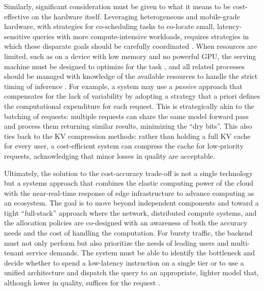 \documentclass[11pt]{article}
\begin{document}
Similarly, significant consideration must be given to what it means to be cost-effective on the hardware itself. Leveraging heterogeneous and mobile-grade hardware, with strategies for co-scheduling tasks to co-locate small, latency-sensitive queries with more compute-intensive workloads, requires strategies in which these disparate goals should be carefully coordinated \cite{ref350}. When resources are limited, such as on a device with low memory and no powerful GPU, the serving machine must be designed to optimize for the task \cite{ref351}, and all related processes should be managed with knowledge of the available resources to handle the strict timing of inference \cite{ref352}. For example, a system may use a \emph{passive} approach that compensates for the lack of variability by adopting a strategy that a priori defines the computational expenditure for each request. This is strategically akin to the batching of requests: multiple requests can share the same model forward pass and process them returning similar results, minimizing the ``dry bits''. This also ties back to the KV compression methods: rather than holding a full KV cache for every user, a cost-efficient system can compress the cache for low-priority requests, acknowledging that minor losses in quality are acceptable.

Ultimately, the solution to the cost-accuracy trade-off is not a single technology but a systems approach that combines the elastic computing power of the cloud with the near-real-time response of edge infrastructure to advance computing as an ecosystem. The goal is to move beyond independent components and toward a tight ``full-stack'' approach where the network, distributed compute systems, and the allocation policies are co-designed with an awareness of both the accuracy needs and the cost of handling the computation. For bursty traffic, the backend must not only perform but also prioritize the needs of leading users and multi-tenant service demands. The system must be able to identify the bottleneck and decide whether to spend a low-latency instruction on a single tier or to use a unified architecture and dispatch the query to an appropriate, lighter model that, although lower in quality, suffices for the request \cite{ref353}.
\end{document}
